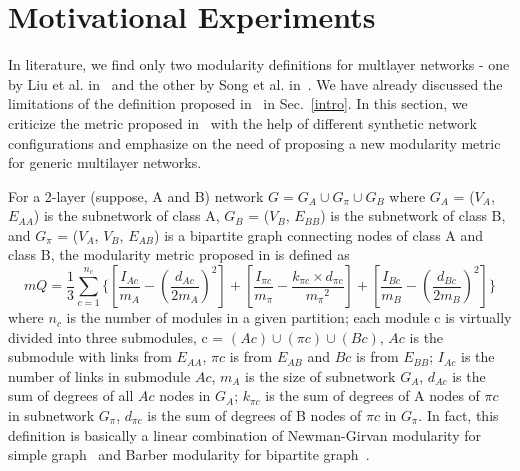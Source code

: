 \section{Motivational Experiments}
\label{experiment}


In literature, we find only two modularity definitions for multlayer networks - one by Liu et al. in~\cite{CompMod} and the other 
by Song et al. in~\cite{medical_paper}. We have already discussed the limitations of the definition proposed in~\cite{CompMod}
in Sec.~\ref{intro}.
In this section, we criticize the metric proposed in~\cite{medical_paper} with the help of different synthetic network
configurations and emphasize on the need of proposing a new modularity metric for generic multilayer networks.

For a 2-layer (suppose, A and B) network $G=G_A \cup G_\pi \cup G_B$ where $G_A$ = ($V_A$, $E_{AA}$) is the subnetwork 
of class A, $G_B$ =
($V_B$, $E_{BB}$) is the subnetwork of class B, and $G_\pi$ = ($V_A$, $V_B$, $E_{AB}$) is a bipartite graph connecting
nodes of class A and class B, the modularity metric proposed in \cite{medical_paper} is defined as 
\begin{equation}\label{eqn1}
 mQ=\frac{1}{3}\sum_{c=1}^{n_c}\{[\frac{I_{Ac}}{m_A}-(\frac{d_{Ac}}{2m_A})^2]+[\frac{I_{\pi c}}{m_\pi}-\frac{k_{\pi c}\times{d_{\pi c}}}{{m_\pi}^2}]+
 [\frac{I_{Bc}}{m_B}-(\frac{d_{Bc}}{2m_B})^2]\}
\end{equation}
where $n_c$ is the number of modules in a given partition; each module c is virtually divided into three
submodules, c = $(Ac)\cup(\pi c)\cup(Bc)$, $Ac$ is the submodule with links from $E_{AA}$, $\pi c$ is from $E_{AB}$
and $Bc$ is from $E_{BB}$; $I_{Ac}$ is the number of links in submodule $Ac$, $m_A$ is the size of subnetwork
$G_A$, $d_{Ac}$ is the sum of degrees of all $Ac$ nodes in $G_A$; $k_{\pi c}$ is the sum of degrees of A nodes of $\pi c$
in subnetwork $G_\pi$, $d_{\pi c}$ is the sum of degrees of B nodes of $\pi c$ in $G_\pi$.
In fact, this definition is basically a linear combination of Newman-Girvan modularity for simple graph~\cite{newman2004finding} 
and Barber modularity for bipartite graph~\cite{barber2007modularity}.

